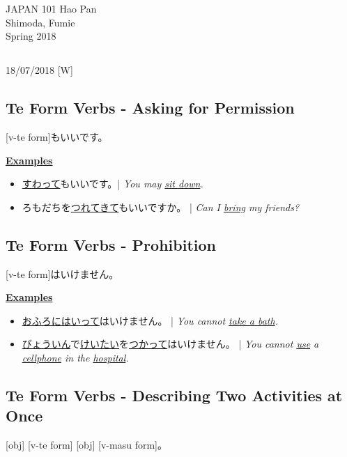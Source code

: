 \documentclass{article}
\begin{document}
 \begin{CJK}{UTF8}{min}

\noindent
{JAPAN 101 \hfill Hao Pan}\\
{Shimoda, Fumie}\\
{Spring 2018}


\begin{center}
\section{}
\noindent
{\hfill 18/07/2018 [W]}
\end{center}

\subsection{Te Form Verbs - Asking for Permission}
[v-te form]もいいです。

\bigskip

\uline{\bf Examples}
\begin{itemize}
\item \uline{すわって}もいいです。| \emph{You may \uline{sit down}.}
\item ろもだちを\uline{つれてきて}もいいですか。 | \emph{Can I \uline{bring} my friends?}
\end{itemize}

\subsection{Te Form Verbs - Prohibition}
[v-te form]はいけません。

\bigskip

\uline{\bf Examples}
\begin{itemize}
\item \uline{おふろにはいって}はいけません。 | \emph{You cannot \uline{take a bath}.}
\item \uline{びょういん}で\uline{けいたい}を\uline{つかって}はいけません。 | \emph{You cannot \uline{use} a \uline{cellphone} in the \uline{hospital}.}
\end{itemize}

\subsection{Te Form Verbs - Describing Two Activities at Once}
[obj] [v-te form] [obj] [v-masu form]。


\end{CJK}
\end{document}
